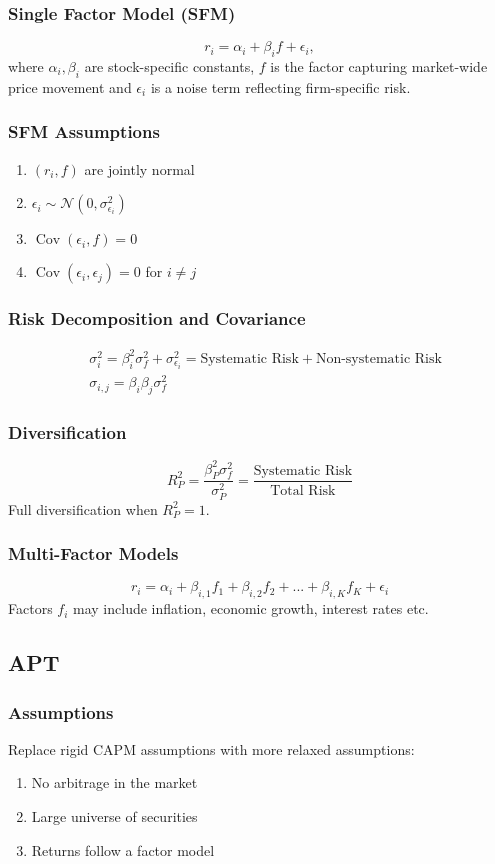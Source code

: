 \documentclass[11pt]{article}
\newcommand{\Cov}{\operatorname{Cov}}
\begin{document}
	\subsubsection{Single Factor Model (SFM)}
	\[	r_i = \alpha_i + \beta_i f + \epsilon_i, \]
	where \( \alpha_i, \beta_i \) are stock-specific constants, \( f \) is the factor capturing market-wide price movement and \( \epsilon_i \) is a noise term reflecting firm-specific risk.
	\subsubsection{SFM Assumptions}
	\begin{enumerate}
		\item \( (r_i, f) \) are jointly normal
		\item \( \epsilon_i\sim\mathcal{N}(0, \sigma_{\epsilon_i}^2) \)
		\item \( \Cov(\epsilon_i, f) = 0 \)
		\item \( \Cov(\epsilon_i, \epsilon_j) = 0 \) for \( i\neq j \)
	\end{enumerate}
	\subsubsection{Risk Decomposition and Covariance}
	\begin{align*}
	& \sigma_i^2 = \beta_i^2 \sigma_f^2 + \sigma_{\epsilon_{i}}^2 = \text{Systematic Risk} + \text{Non-systematic Risk}\\
	& \sigma_{i, j} = \beta_i \beta_j \sigma_f^2
	\end{align*}
	\subsubsection{Diversification}	
	\[	R_P^2 = \frac{\beta_P^2 \sigma_f^2}{\sigma_P^2} = \frac{\text{Systematic Risk}}{\text{Total Risk}}\]
	Full diversification when \( R_P^2 = 1 \).
	\subsubsection{Multi-Factor Models}
	\[	r_i = \alpha_i + \beta_{i, 1}f_1 + \beta_{i, 2}f_2 + ... + \beta_{i, K} f_K + \epsilon_i \]
	Factors \( f_i \) may include inflation, economic growth, interest rates etc.
	\subsection{APT}
	\subsubsection{Assumptions}
	Replace rigid CAPM assumptions with more relaxed assumptions:
	\begin{enumerate}
		\item No arbitrage in the market
		\item Large universe of securities
		\item Returns follow a factor model
	\end{enumerate}
\end{document}
